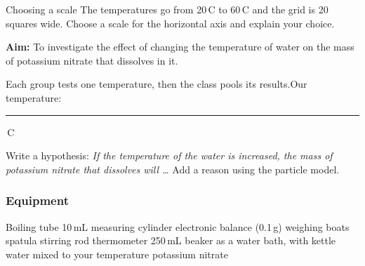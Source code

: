 \begin{wedo}{Choosing a scale}
The temperatures go from 20\,\textdegree C to 60\,\textdegree C and the grid is 20 squares wide. Choose a scale for the horizontal axis and explain your choice.
\answerbox{3cm}
\end{wedo}


\textbf{Aim:} To investigate the effect of changing the temperature of water on the mass of potassium nitrate that dissolves in it.

Each group tests one temperature, then the class pools its results.\quad Our temperature: \rule{2cm}{0.4pt}\,\textdegree C

\task Write a hypothesis: \emph{If the temperature of the water is increased, the mass of potassium nitrate that dissolves will \dots} Add a reason using the particle model. 
\answerbox{4cm}

\subsubsection*{Equipment}
Boiling tube \textbullet{} 10\,mL measuring cylinder \textbullet{} electronic balance (0.1\,g) \textbullet{} weighing boats \textbullet{} spatula \textbullet{} stirring rod \textbullet{} thermometer \textbullet{} 250\,mL beaker as a water bath, with kettle water mixed to your temperature \textbullet{} potassium nitrate

\begin{center}
\end{center}

